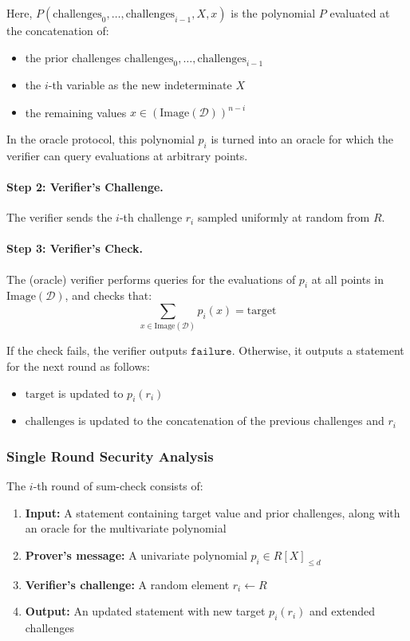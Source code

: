 Here, $P(\text{challenges}_0, \ldots, \text{challenges}_{i-1}, X, x)$ is the polynomial $P$ evaluated at the concatenation of:
\begin{itemize}
    \item the prior challenges $\text{challenges}_0, \ldots, \text{challenges}_{i-1}$
    \item the $i$-th variable as the new indeterminate $X$
    \item the remaining values $x \in (\text{Image}(\mathcal{D}))^{n-i}$
\end{itemize}

In the oracle protocol, this polynomial $p_i$ is turned into an oracle for which the verifier can query evaluations at arbitrary points.

\paragraph{Step 2: Verifier's Challenge.} The verifier sends the $i$-th challenge $r_i$ sampled uniformly at random from $R$.

\paragraph{Step 3: Verifier's Check.} The (oracle) verifier performs queries for the evaluations of $p_i$ at all points in $\text{Image}(\mathcal{D})$, and checks that:
\[
\sum_{x \in \text{Image}(\mathcal{D})} p_i(x) = \text{target}
\]

If the check fails, the verifier outputs $\texttt{failure}$. Otherwise, it outputs a statement for the next round as follows:
\begin{itemize}
    \item $\text{target}$ is updated to $p_i(r_i)$
    \item $\text{challenges}$ is updated to the concatenation of the previous challenges and $r_i$
\end{itemize}

\subsubsection{Single Round Security Analysis}

\begin{definition}
    \label{def:sumcheck_single_round}
    The $i$-th round of sum-check consists of:
    \begin{enumerate}
        \item \textbf{Input:} A statement containing target value and prior challenges, along with an oracle for the multivariate polynomial
        \item \textbf{Prover's message:} A univariate polynomial $p_i \in R[X]_{\leq d}$
        \item \textbf{Verifier's challenge:} A random element $r_i \gets R$
        \item \textbf{Output:} An updated statement with new target $p_i(r_i)$ and extended challenges
    \end{enumerate}
\end{definition}

